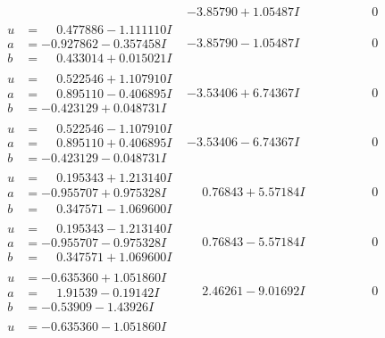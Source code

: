 \documentclass[1p]{elsarticle_modified}
\theoremstyle{definition}
\begin{document}
$$\begin{array}{c|c|c}
 & -3.85790 + 1.05487 I & \phantom{-0.000000 } 0 \\ \hline\begin{aligned}
u &= \phantom{-}0.477886 - 1.111110 I \\
a &= -0.927862 - 0.357458 I \\
b &= \phantom{-}0.433014 + 0.015021 I\end{aligned}
 & -3.85790 - 1.05487 I & \phantom{-0.000000 } 0 \\ \hline\begin{aligned}
u &= \phantom{-}0.522546 + 1.107910 I \\
a &= \phantom{-}0.895110 - 0.406895 I \\
b &= -0.423129 + 0.048731 I\end{aligned}
 & -3.53406 + 6.74367 I & \phantom{-0.000000 } 0 \\ \hline\begin{aligned}
u &= \phantom{-}0.522546 - 1.107910 I \\
a &= \phantom{-}0.895110 + 0.406895 I \\
b &= -0.423129 - 0.048731 I\end{aligned}
 & -3.53406 - 6.74367 I & \phantom{-0.000000 } 0 \\ \hline\begin{aligned}
u &= \phantom{-}0.195343 + 1.213140 I \\
a &= -0.955707 + 0.975328 I \\
b &= \phantom{-}0.347571 - 1.069600 I\end{aligned}
 & \phantom{-}0.76843 + 5.57184 I & \phantom{-0.000000 } 0 \\ \hline\begin{aligned}
u &= \phantom{-}0.195343 - 1.213140 I \\
a &= -0.955707 - 0.975328 I \\
b &= \phantom{-}0.347571 + 1.069600 I\end{aligned}
 & \phantom{-}0.76843 - 5.57184 I & \phantom{-0.000000 } 0 \\ \hline\begin{aligned}
u &= -0.635360 + 1.051860 I \\
a &= \phantom{-}1.91539 - 0.19142 I \\
b &= -0.53909 - 1.43926 I\end{aligned}
 & \phantom{-}2.46261 - 9.01692 I & \phantom{-0.000000 } 0 \\ \hline\begin{aligned}
u &= -0.635360 - 1.051860 I \\

\end{aligned}
\end{array}$$
\end{document}
